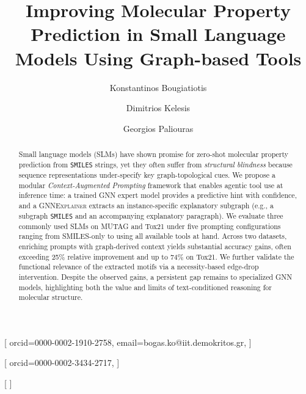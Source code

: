 \documentclass[
]{ceurart}
\newcommand{\smiles}{\texttt{SMILES}}
\newcommand{\gnne}{\textsc{GNNExplainer}}
\begin{document}


\title{Improving Molecular Property Prediction in Small Language Models Using Graph-based Tools}


\author[1]{Konstantinos Bougiatiotis}[%
orcid=0000-0002-1910-2758,
email=bogas.ko@iit.demokritos.gr,
]
\fnmark[1]
\cormark[1]

\address[1]{Institute of Informatics and Telecommunications, National Center for Scientific Research ``Demokritos", Athens, Greece}

\author[1]{Dimitrios Kelesis}[%
orcid=0000-0002-3434-2717,
]
\fnmark[1]

\author[1]{Georgios Paliouras}[%
]
\begin{abstract}
Small language models (SLMs) have shown promise for zero-shot molecular property prediction from \smiles{} strings, yet they often suffer from \emph{structural blindness} because sequence representations under-specify key graph-topological cues. We propose a modular \textit{Context-Augmented Prompting} framework that enables agentic tool use at inference time: a trained GNN expert model provides a predictive hint with confidence, and a \gnne{} extracts an instance-specific explanatory subgraph (e.g., a subgraph \smiles{} and an accompanying explanatory paragraph). We evaluate three commonly used SLMs on MUTAG and Tox21 under five prompting configurations ranging from SMILES-only to using all available tools at hand. Across two datasets, enriching prompts with graph-derived context yields substantial accuracy gains, often exceeding 25\% relative improvement and up to 74\% on Tox21. We further validate the functional relevance of the extracted motifs via a necessity-based edge-drop intervention. Despite the observed gains, a persistent gap remains to specialized GNN models, highlighting both the value and limits of text-conditioned reasoning for molecular structure.

\end{abstract}
\end{document}
